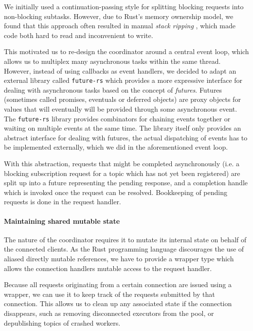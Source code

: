 We initially used a continuation-passing style for splitting blocking requests into
non-blocking subtasks. However, due to Rust's memory ownership model, we found that
this approach often resulted in manual \emph{stack ripping} \cite{stackmgmt},
which made code both hard to read and inconvenient to write.

This motivated us to re-design the coordinator around a central event loop, which
allows us to multiplex many asynchronous tasks within the same thread. However,
instead of using callbacks as event handlers, we decided to adapt an external
library called \lstinline{future-rs} which provides a more expressive interface
for dealing with asynchronous tasks based on the concept of \emph{futures}. Futures
(sometimes called promises, eventuals or deferred objects) are proxy objects for
values that will eventually will be provided through some asynchronous event.
The \lstinline{future-rs} library provides combinators for chaining events
together or waiting on multiple events at the same time. The library itself
only provides an abstract interface for dealing with futures, the actual
dispatching of events has to be implemented externally, which we did in the
aforementioned event loop.

With this abstraction, requests that might be completed asynchronously
(i.e. a blocking subscription request for a topic which has not yet been registered)
are split up into a future representing the pending response, and a completion handle
which is invoked once the request can be resolved. Bookkeeping of pending requests
is done in the request handler.

\paragraph{Maintaining shared mutable state}

The nature of the coordinator requires it to mutate its internal state on
behalf of the connected clients. As the Rust programming language discourages
the use of aliased directly mutable references, we have to provide a wrapper
type which allows the connection handlers mutable access to the request handler.

Because all requests originating from a certain connection are issued using a
wrapper, we can use it to keep track of the requests submitted by that connection.
This allows us to clean up any associated state if the connection disappears,
such as removing disconnected executors from the pool, or depublishing 
topics of crashed workers.

